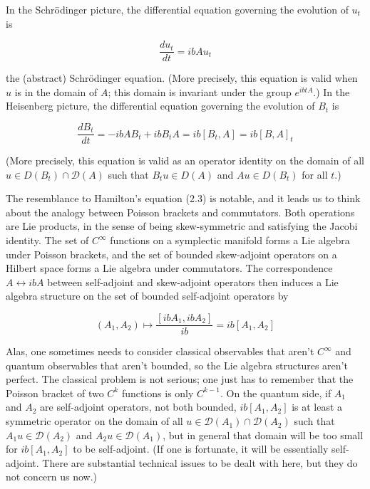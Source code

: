 \documentclass[10pt, letterpaper]{article}
\begin{document}
In the Schrödinger picture, the differential equation governing the evolution of $u_{t}$ is

$$
\frac{d u_{t}}{d t}=i b A u_{t}
$$

the (abstract) Schrödinger equation. (More precisely, this equation is valid when $u$ is in the domain of $A$; this domain is invariant under the group $e^{i b t A}$.) In the Heisenberg picture, the differential equation governing the evolution of $B_{t}$ is

$$
\frac{d B_{t}}{d t}=-i b A B_{t}+i b B_{t} A=i b\left[B_{t}, A\right]=i b[B, A]_{t}
$$

(More precisely, this equation is valid as an operator identity on the domain of all $u \in D\left(B_{t}\right) \cap \mathcal{D}(A)$ such that $B_{t} u \in D(A)$ and $A u \in D\left(B_{t}\right)$ for all $t$.)

The resemblance to Hamilton's equation (2.3) is notable, and it leads us to think about the analogy between Poisson brackets and commutators. Both operations are Lie products, in the sense of being skew-symmetric and satisfying the Jacobi identity. The set of $C^{\infty}$ functions on a symplectic manifold forms a Lie algebra under Poisson brackets, and the set of bounded skew-adjoint operators on a Hilbert space forms a Lie algebra under commutators. The correspondence $A \leftrightarrow i b A$ between self-adjoint and skew-adjoint operators then induces a Lie algebra structure on the set of bounded self-adjoint operators by

$$
\left(A_{1}, A_{2}\right) \mapsto \frac{\left[i b A_{1}, i b A_{2}\right]}{i b}=i b\left[A_{1}, A_{2}\right]
$$

Alas, one sometimes needs to consider classical observables that aren't $C^{\infty}$ and quantum observables that aren't bounded, so the Lie algebra structures aren't perfect. The classical problem is not serious; one just has to remember that the Poisson bracket of two $C^{k}$ functions is only $C^{k-1}$. On the quantum side, if $A_{1}$ and $A_{2}$ are self-adjoint operators, not both bounded, $i b\left[A_{1}, A_{2}\right]$ is at least a symmetric operator on the domain of all $u \in \mathcal{D}\left(A_{1}\right) \cap \mathcal{D}\left(A_{2}\right)$ such that $A_{1} u \in \mathcal{D}\left(A_{2}\right)$ and $A_{2} u \in \mathcal{D}\left(A_{1}\right)$, but in general that domain will be too small for $i b\left[A_{1}, A_{2}\right]$ to be self-adjoint. (If one is fortunate, it will be essentially self-adjoint. There are substantial technical issues to be dealt with here, but they do not concern us now.)
\end{document}

